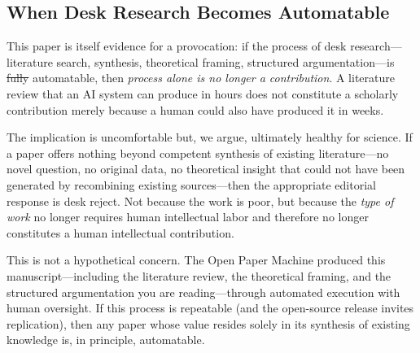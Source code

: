 \documentclass{article}
\providecommand{\DIFaddtex}[1]{{\protect\color{blue}\uwave{#1}}} %
\providecommand{\DIFdeltex}[1]{{\protect\color{red}\sout{#1}}}                      %
\providecommand{\DIFaddbegin}{} %
\providecommand{\DIFaddend}{} %
\providecommand{\DIFdelbegin}{} %
\providecommand{\DIFdelend}{} %
\providecommand{\DIFadd}[1]{\texorpdfstring{\DIFaddtex{#1}}{#1}} %
\providecommand{\DIFdel}[1]{\texorpdfstring{\DIFdeltex{#1}}{}} %
\newcommand{\DIFscaledelfig}{0.5}
\newlength{\DIFdelgraphicswidth} %
\newlength{\DIFdelgraphicsheight} %
\newcommand{\DIFaddincludegraphics}[2][]{{\color{blue}\fbox{\DIFOincludegraphics[#1]{#2}}}} %
\newcommand{\DIFdelincludegraphics}[2][]{%
\sbox{\DIFdelgraphicsbox}{\DIFOincludegraphics[#1]{#2}}%
\settoboxwidth{\DIFdelgraphicswidth}{\DIFdelgraphicsbox} %
\settoboxtotalheight{\DIFdelgraphicsheight}{\DIFdelgraphicsbox} %
\scalebox{\DIFscaledelfig}{%
\parbox[b]{\DIFdelgraphicswidth}{\usebox{\DIFdelgraphicsbox}\\[-\baselineskip] \rule{\DIFdelgraphicswidth}{0em}}\llap{\resizebox{\DIFdelgraphicswidth}{\DIFdelgraphicsheight}{%
\setlength{\unitlength}{\DIFdelgraphicswidth}%
\begin{picture}(1,1)%
\thicklines\linethickness{2pt} %
{\color[rgb]{1,0,0}\put(0,0){\framebox(1,1){}}}%
{\color[rgb]{1,0,0}\put(0,0){\line( 1,1){1}}}%
{\color[rgb]{1,0,0}\put(0,1){\line(1,-1){1}}}%
\end{picture}%
}\hspace*{3pt}}} %
} %
\DeclareRobustCommand{\DIFaddbegin}{\DIFOaddbegin \let\includegraphics\DIFaddincludegraphics} %
\DeclareRobustCommand{\DIFaddend}{\DIFOaddend \let\includegraphics\DIFOincludegraphics} %
\DeclareRobustCommand{\DIFdelbegin}{\DIFOdelbegin \let\includegraphics\DIFdelincludegraphics} %
\DeclareRobustCommand{\DIFdelend}{\DIFOaddend \let\includegraphics\DIFOincludegraphics} %
\begin{document}
\subsection{When Desk Research Becomes Automatable}

This paper is itself evidence for a provocation: if the process of desk research---literature search, synthesis, theoretical framing, structured argumentation---is \DIFdelbegin \DIFdel{fully }\DIFdelend \DIFaddbegin \DIFadd{to a large extent }\DIFaddend automatable, then \textit{process alone is no longer a contribution}. A literature review that an AI system can produce in hours does not constitute a scholarly contribution merely because a human could also have produced it in weeks.

The implication is uncomfortable but, we argue, ultimately healthy for science. If a paper offers nothing beyond competent synthesis of existing literature---no novel question, no original data, no theoretical insight that could not have been generated by recombining existing sources---then the appropriate editorial response is desk reject. Not because the work is poor, but because the \textit{type of work} no longer requires human intellectual labor and therefore no longer constitutes a human intellectual contribution.

This is not a hypothetical concern. The Open Paper Machine produced this manuscript---including the literature review, the theoretical framing, and the structured argumentation you are reading---through automated execution with human oversight. If this process is repeatable (and the open-source release invites replication), then any paper whose value resides solely in its synthesis of existing knowledge is, in principle, automatable.
\end{document}
